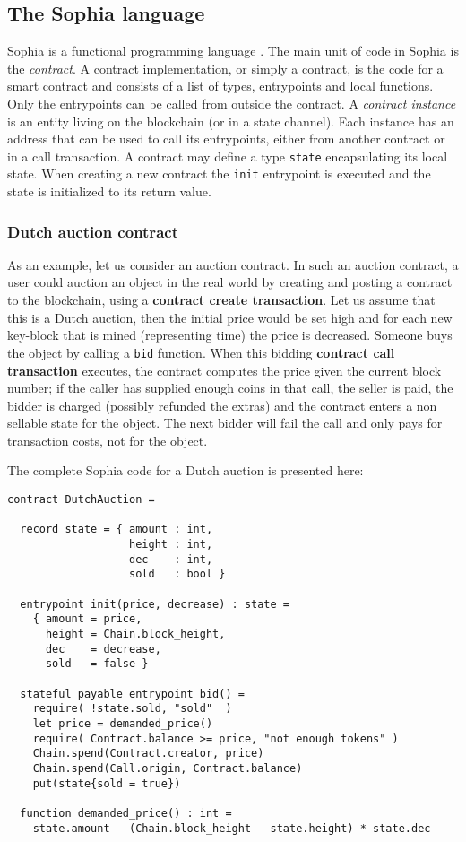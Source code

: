 \subsection{The Sophia language}

Sophia is a functional programming language \cite{hughes1989functional}.
The main unit of code in Sophia is the \textit{contract}.
A contract implementation, or simply a contract, is the code for a
smart contract and consists of a list of types, entrypoints and local
functions. Only the entrypoints can be called from outside the
contract.   A \textit{contract instance} is an entity living on the
blockchain (or in a state channel). Each instance has an address that
can be used to call its entrypoints, either from another contract or
in a call transaction.  A contract may define a type \texttt{state}
encapsulating its local state. When creating a new contract the
\texttt{init} entrypoint is executed and the state is initialized to its
return value.


\subsubsection{Dutch auction contract}

As an example, let us consider an auction contract.  In such an
auction contract, a user could auction an object in the real world by
creating and posting a contract to the blockchain, using a \textbf{contract
create transaction}. Let us assume that
this is a Dutch auction, then the initial price
would be set high and for each new key-block that is mined (representing
time) the price is decreased. Someone buys the object by calling a
\texttt{bid} function. When this bidding \textbf{contract call transaction}
executes,
the contract computes the price given the current block number; if the caller
has
supplied enough coins in that call, the seller is paid, the
bidder is charged (possibly refunded the extras) and the contract
enters a non sellable state for the object. The next bidder will fail
the call and only pays for transaction costs, not for the object.

The complete Sophia code for a Dutch auction is presented here:

\begin{verbatim}
contract DutchAuction =

  record state = { amount : int,
                   height : int,
                   dec    : int,
                   sold   : bool }

  entrypoint init(price, decrease) : state =
    { amount = price,
      height = Chain.block_height,
      dec    = decrease,
      sold   = false }

  stateful payable entrypoint bid() =
    require( !state.sold, "sold"  )
    let price = demanded_price()
    require( Contract.balance >= price, "not enough tokens" )
    Chain.spend(Contract.creator, price)
    Chain.spend(Call.origin, Contract.balance)
    put(state{sold = true})

  function demanded_price() : int =
    state.amount - (Chain.block_height - state.height) * state.dec

\end{verbatim}

